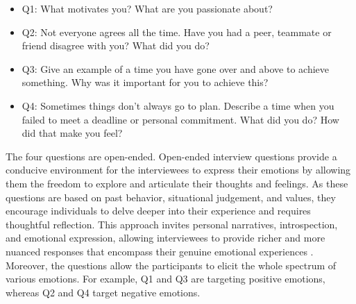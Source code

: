 %
\begin{itemize}
    \item[] Q1: What motivates you? What are you passionate about?
    \item[] Q2: Not everyone agrees all the time. Have you had a peer, teammate or friend disagree with you? What did you do?
    \item[] Q3: Give an example of a time you have gone over and above to achieve something. Why was it important for you to achieve this?
    \item[] Q4: Sometimes things don’t always go to plan. Describe a time when you failed to meet a deadline or personal commitment. What did you do? How did that make you feel?
\end{itemize}
%
The four questions are open-ended. Open-ended interview questions provide a conducive environment for the interviewees to express their emotions by allowing them the freedom to explore and articulate their thoughts and feelings. As these questions are based on past behavior, situational judgement, and values, they encourage individuals to delve deeper into their experience and requires thoughtful reflection. This approach invites personal narratives, introspection, and emotional expression, allowing interviewees to provide richer and more nuanced responses that encompass their genuine emotional experiences \cite{personality-prediction-questions-9121971} \cite{emotions_question_johnson2020emotions}. Moreover, the questions allow the participants to elicit the whole spectrum of various emotions. For example, Q1 and Q3 are targeting positive emotions, whereas Q2 and Q4 target negative emotions. \\

